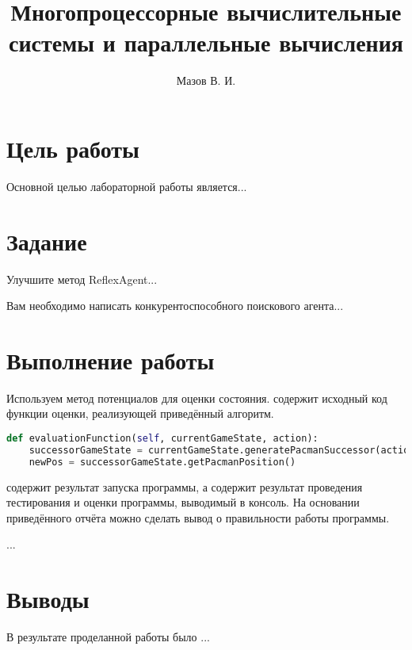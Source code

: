 \documentclass{lab_report}
\begin{document}
\title{Многопроцессорные вычислительные системы и параллельные вычисления}
\author{Мазов В. И.}

\maketitle

\tableofcontents

\section{Цель работы}
Основной целью лабораторной работы является...


\section{Задание}
\begin{task}
	Улучшите метод ReflexAgent...
\end{task}

\begin{task}
	Вам необходимо написать конкурентоспособного поискового агента...
\end{task}

\section{Выполнение работы}

\taskDoneSection
Используем метод потенциалов для оценки состояния.  содержит исходный код функции оценки, реализующей приведённый алгоритм.

\begin{lstlisting}[language={Python}, label={lis:eval}, caption={Функция оценки}, captionpos=t]
def evaluationFunction(self, currentGameState, action): 
	successorGameState = currentGameState.generatePacmanSuccessor(action)
	newPos = successorGameState.getPacmanPosition()
\end{lstlisting}

 содержит результат запуска программы, а  содержит результат проведения тестирования и оценки программы, выводимый в консоль. На основании приведённого отчёта можно сделать вывод о правильности работы программы.


\taskDoneSection
...

\section{Выводы}
В результате проделанной работы было ...
\end{document}
